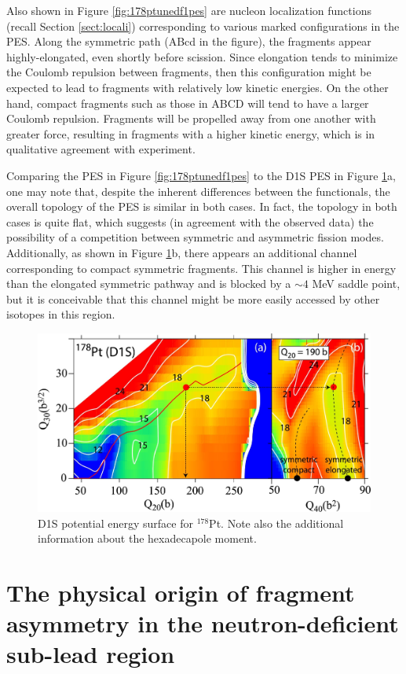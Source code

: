 Also shown in Figure \ref{fig:178ptunedf1pes} are nucleon localization functions (recall Section \ref{sect:locali}) corresponding to various marked configurations in the PES. Along the symmetric path (ABcd in the figure), the fragments appear highly-elongated, even shortly before scission. Since elongation tends to minimize the Coulomb repulsion between fragments, then this configuration might be expected to lead to fragments with relatively low kinetic energies. On the other hand, compact fragments such as those in ABCD will tend to have a larger Coulomb repulsion. Fragments will be propelled away from one another with greater force, resulting in fragments with a higher kinetic energy, which is in qualitative agreement with experiment.

Comparing the {\hfb} PES in Figure \ref{fig:178ptunedf1pes} to the D1S PES in Figure \ref{fig:178ptd1spes}a, one may note that, despite the inherent differences between the functionals, the overall topology of the PES is similar in both cases. In fact, the topology in both cases is quite flat, which suggests (in agreement with the observed data) the possibility of a competition between symmetric and asymmetric fission modes. Additionally, as shown in Figure \ref{fig:178ptd1spes}b, there appears an additional channel corresponding to compact symmetric fragments. This channel is higher in energy than the elongated symmetric pathway and is blocked by a $\sim4$ MeV saddle point, but it is conceivable that this channel might be more easily accessed by other isotopes in this region.

\begin{figure}
	\centering
	\includegraphics[width=0.7\linewidth]{TeX_files/178Pt_D1S_pes.jpg}
	\caption[D1S potential energy surface for $^{178}$Pt]{D1S potential energy surface for $^{178}$Pt. Note also the additional information about the hexadecapole moment.}
	\label{fig:178ptd1spes}
\end{figure}



\section{The physical origin of fragment asymmetry in the neutron-deficient sub-lead region}

